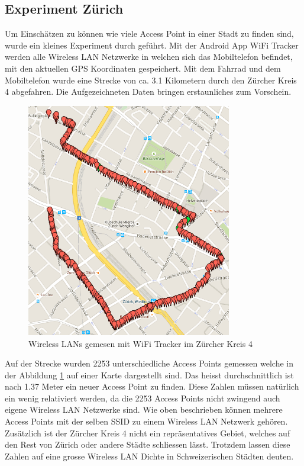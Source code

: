 \subsection{Experiment Zürich}
Um Einschätzen zu können wie viele Access Point in einer Stadt zu finden sind, wurde ein kleines Experiment durch geführt. Mit der Android App WiFi Tracker\citep{google.play.wifitracker} werden alle Wireless LAN Netzwerke in welchen sich das Mobiltelefon befindet, mit den aktuellen GPS Koordinaten gespeichert. Mit dem Fahrrad und dem Mobiltelefon wurde eine Strecke von ca. 3.1 Kilometern durch den Zürcher Kreis 4 abgefahren. Die Aufgezeichneten Daten bringen erstaunliches zum Vorschein.
\begin{figure}[ht]
	\centering
	\includegraphics[width=0.8\textwidth]{images/wifikreis4.png}
	\caption{Wireless LANs gemesen mit WiFi Tracker im Zürcher Kreis 4}
	\label{fig:wifikreis4}
\end{figure}
Auf der Strecke wurden 2253 unterschiedliche Access Points gemessen welche in der Abbildung \ref{fig:wifikreis4} auf einer Karte dargestellt sind. Das heisst durchschnittlich ist nach 1.37 Meter ein neuer Access Point zu finden. Diese Zahlen müssen natürlich ein wenig relativiert werden, da die 2253 Access Points nicht zwingend auch eigene Wireless LAN Netzwerke sind. Wie oben beschrieben können mehrere Access Points mit der selben SSID zu einem Wireless LAN Netzwerk gehören. Zusätzlich ist der Zürcher Kreis 4 nicht ein repräsentatives Gebiet, welches auf den Rest von Zürich oder andere Städte schliessen lässt. Trotzdem lassen diese Zahlen auf eine grosse Wireless LAN Dichte in Schweizerischen Städten deuten.


